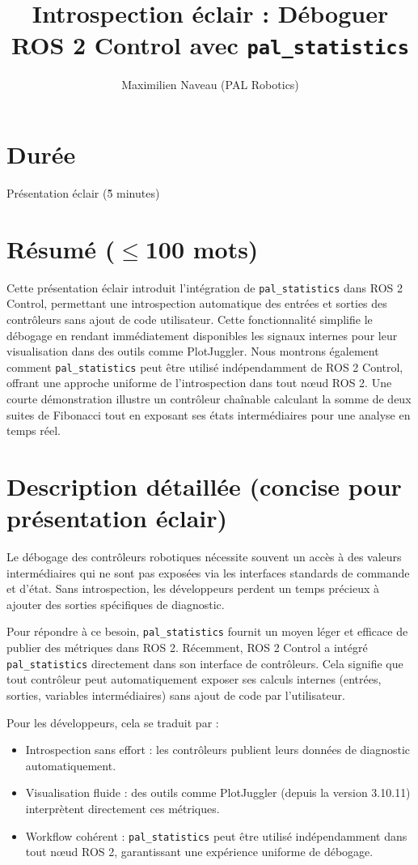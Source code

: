 \documentclass[11pt,a4paper]{article}
\title{Introspection éclair : Déboguer ROS 2 Control avec \texttt{pal\_statistics}}
\author{Maximilien Naveau (PAL Robotics)}
\date{}
\begin{document}
\maketitle

\section*{Durée}
Présentation éclair (\~5 minutes)

\section*{Résumé ($\leq$100 mots)}
Cette présentation éclair introduit l'intégration de \texttt{pal\_statistics} dans ROS 2 Control, permettant une introspection automatique des entrées et sorties des contrôleurs sans ajout de code utilisateur. Cette fonctionnalité simplifie le débogage en rendant immédiatement disponibles les signaux internes pour leur visualisation dans des outils comme PlotJuggler. Nous montrons également comment \texttt{pal\_statistics} peut être utilisé indépendamment de ROS 2 Control, offrant une approche uniforme de l'introspection dans tout nœud ROS 2. Une courte démonstration illustre un contrôleur chaînable calculant la somme de deux suites de Fibonacci tout en exposant ses états intermédiaires pour une analyse en temps réel.

\section*{Description détaillée (concise pour présentation éclair)}
Le débogage des contrôleurs robotiques nécessite souvent un accès à des valeurs intermédiaires qui ne sont pas exposées via les interfaces standards de commande et d'état. Sans introspection, les développeurs perdent un temps précieux à ajouter des sorties spécifiques de diagnostic.  

Pour répondre à ce besoin, \texttt{pal\_statistics} fournit un moyen léger et efficace de publier des métriques dans ROS 2. Récemment, ROS 2 Control a intégré \texttt{pal\_statistics} directement dans son interface de contrôleurs. Cela signifie que tout contrôleur peut automatiquement exposer ses calculs internes (entrées, sorties, variables intermédiaires) sans ajout de code par l'utilisateur.  

Pour les développeurs, cela se traduit par :
\begin{itemize}
  \item Introspection sans effort : les contrôleurs publient leurs données de diagnostic automatiquement.
  \item Visualisation fluide : des outils comme PlotJuggler (depuis la version 3.10.11) interprètent directement ces métriques.
  \item Workflow cohérent : \texttt{pal\_statistics} peut être utilisé indépendamment dans tout nœud ROS 2, garantissant une expérience uniforme de débogage.
\end{itemize}
\end{document}
